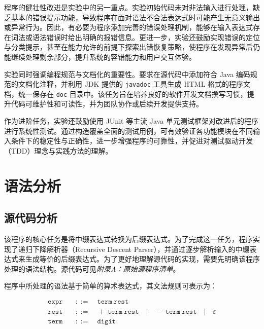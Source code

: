 \documentclass[a4paper, twoside, utf8]{ctexart}
\begin{document}
    程序的健壮性改进是实验中的另一重点。实验初始代码未对非法输入进行处理，缺乏基本的错误提示功能，导致程序在面对语法不合法表达式时可能产生无意义输出或异常行为。因此，有必要为程序添加完善的错误处理机制，能够在输入表达式存在词法或语法错误时给出明确的报错信息。更进一步，实验还鼓励实现错误的定位与分类提示，甚至在能力允许的前提下探索出错恢复策略，使程序在发现异常后仍能继续处理剩余部分，提升系统的容错能力和用户交互体验。
    
    实验同时强调编程规范与文档化的重要性。要求在源代码中添加符合 Java 编码规范的文档化注释，并利用 JDK 提供的 \verb|javadoc| 工具生成 HTML 格式的程序文档，统一保存在 \verb|doc| 目录中。该任务旨在培养良好的软件开发文档撰写习惯，提升代码可维护性和可读性，并为团队协作或后续开发提供支持。
    
    作为进阶任务，实验还鼓励使用 JUnit 等主流 Java 单元测试框架对改进后的程序进行系统性测试。通过构造覆盖全面的测试用例，可有效验证各功能模块在不同输入条件下的稳定性与正确性，进一步增强程序的可靠性，并促进对测试驱动开发（TDD）理念与实践方法的理解。

    \section{语法分析}

    \subsection{源代码分析}

    该程序的核心任务是将中缀表达式转换为后缀表达式。为了完成这一任务，程序实现了递归下降解析器（Recursive Descent Parser），并通过逐步解析输入的中缀表达式来生成等价的后缀表达式。为了更好地理解源代码的实现，需要先明确该程序处理的语法结构。源代码可见\textit{附录A：原始源程序清单}。

    程序中所处理的语法基于简单的算术表达式，其文法规则可表示为：

    \begin{equation}
        \begin{aligned}
            \texttt{expr} \quad & ::= \quad \texttt{term} \ \texttt{rest} \\
            \texttt{rest} \quad & ::= \quad + \ \texttt{term} \ \texttt{rest} \quad | \quad - \ \texttt{term} \ \texttt{rest} \quad | \quad \varepsilon \\
            \texttt{term} \quad & ::=  \quad \texttt{digit} \\
        \end{aligned}
    \end{equation}
    \vspace{.5em}
    
\end{document}
